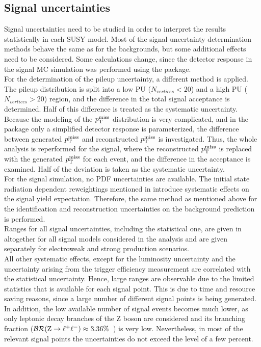 \subsection{Signal uncertainties}
Signal uncertainties need to be studied in order to interpret the results statistically in each SUSY model.
Most of the signal uncertainty determination methods behave the same as for the backgrounds, but some additional effects need to be considered. Some calculations change, since the detector response in the signal MC simulation was performed using the \FASTSIM package.\\
For the determination of the pileup uncertainty, a different method is applied. The pileup distribution is split into a low PU ($N_{vertices}<20$) and a high PU ($N_{vertices}>20$) region, and the difference in the total signal acceptance is determined. Half of this difference is treated as the systematic uncertainty.\\
Because the modeling of the $p_{\mathrm{T}}^\text{miss}$ distribution is very complicated, and in the \FASTSIM package only a simplified detector response is parameterized, the difference between generated $p_{\mathrm{T}}^\text{miss}$ and reconstructed $p_{\mathrm{T}}^\text{miss}$ is investigated. Thus, the whole analysis is reperformed for the signal, where the reconstructed $p_{\mathrm{T}}^\text{miss}$ is replaced with the generated $p_{\mathrm{T}}^\text{miss}$ for each event, and the difference in the acceptance is examined. Half of the deviation is taken as the systematic uncertainty.\\
For the signal simulation, no PDF uncertainties are available. The initial state radiation dependent reweightings mentioned in  introduce systematic effects on the signal yield expectation. Therefore, the same method as mentioned above for the identification and reconstruction uncertainties on the background prediction is performed.\\
Ranges for all signal uncertainties, including the statistical one, are given in  altogether for all signal models considered in the analysis and are given separately for electroweak and strong production scenarios.\\
All other systematic effects, except for the luminosity uncertainty and the uncertainty arising from the trigger efficiency measurement are correlated with the statistical uncertainty.
Hence, large ranges are observable due to the limited statistics that is available for each signal point. This is due to time and resource saving reasons, since a large number of different signal points is being generated. In addition, the low available number of signal events becomes much lower, as only leptonic decay branches of the Z boson are considered and its branching fraction ($\mathcal{BR}(\mathrm{Z}\to\ell^+\ell^-)\approx3.36\%$~\cite{PDG}) is very low. Nevertheless, in most of the relevant signal points the uncertainties do not exceed the level of a few percent.
